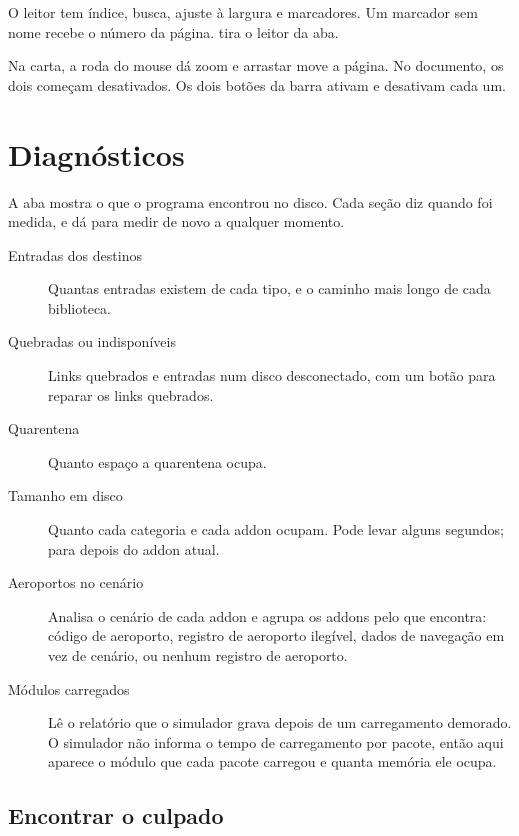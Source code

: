 \documentclass[11pt,a4paper]{article}
\begin{document}
O leitor tem índice, busca, ajuste à largura e marcadores. Um marcador sem nome
recebe o número da página.  tira o leitor da aba.


Na carta, a roda do mouse dá zoom e arrastar move a página. No documento, os
dois começam desativados. Os dois botões da barra ativam e desativam cada um.

\section{Diagnósticos}

A aba  mostra o que o programa encontrou no disco. Cada seção
diz quando foi medida, e dá para medir de novo a qualquer momento.


\begin{description}
  \item[Entradas dos destinos] Quantas entradas existem de cada tipo, e o
    caminho mais longo de cada biblioteca.
  \item[Quebradas ou indisponíveis] Links quebrados e entradas num disco
    desconectado, com um botão para reparar os links quebrados.
  \item[Quarentena] Quanto espaço a quarentena ocupa.
  \item[Tamanho em disco] Quanto cada categoria e cada addon ocupam. Pode levar
    alguns segundos;  para depois do addon atual.
  \item[Aeroportos no cenário] Analisa o cenário de cada addon e agrupa os
    addons pelo que encontra: código de aeroporto, registro de aeroporto
    ilegível, dados de navegação em vez de cenário, ou nenhum registro de
    aeroporto.
  \item[Módulos carregados] Lê o relatório que o simulador grava depois de um
    carregamento demorado. O simulador não informa o tempo de carregamento por
    pacote, então aqui aparece o módulo que cada pacote carregou e quanta
    memória ele ocupa.
\end{description}

\subsection{Encontrar o culpado}
\end{document}
